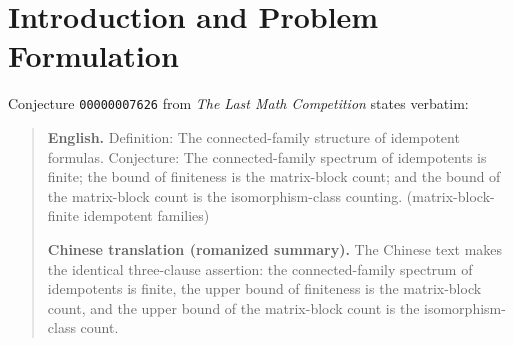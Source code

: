 \documentclass[11pt,a4paper]{article}
\theoremstyle{definition}
\newcommand{\Z}{\mathbb{Z}}
\newcommand{\N}{\mathbb{N}}
\newcommand{\Cl}{\mathrm{Cl}}
\newcommand{\Prim}{\mathrm{Prim}}
\begin{document}
\begin{abstract}
\begin{enumerate}
    $c_{\mathrm{alg}}(A)\le b(A)$, with strict failure $b(A)>c_{\mathrm{alg}}(A)=1$ whenever
    isomorphic blocks repeat (e.g.\ $\Cl_{1,0}(K)\cong K\oplus K$ gives $|\pi_0(E)|=4>b=2>c_{\mathrm{alg}}=1$,
    and $\Cl_{2,1}(K)\cong M_2(K)\oplus M_2(K)$ gives $|\pi_0(E^\circ)|=7>b=2>c_{\mathrm{alg}}=1$).
    Under module-isomorphism readings ($c_{\mathrm{simp}}=b$ or $c_{\mathrm{proj}}=\prod(n_i+1)$),
    the chained conjecture still fails at Clause~II.
  \item \textbf{Conceptual origin and primitive salvage:} Restricting to \emph{primitive}
    idempotents $\Prim(E(A))$ yields $|\pi_0(\Prim(E(A)))|=b(A)=c_{\mathrm{simp}}(A)$,
    identifying the conflation of primitive idempotents with general idempotents as the root
    source of the conjecture. Without finite-dimensionality, even Clause~I fails on $\Z^\N$.
\end{enumerate}
All core algebraic theorems, counterexamples, non-vacuity bijections, and nilpotent lifting
identities are machine-checked from first principles in Core Lean~4.19.0 with zero external
dependencies and zero \texttt{sorry} axioms.
\end{abstract}

\section{Introduction and Problem Formulation}

Conjecture \texttt{00000007626} from \emph{The Last Math Competition} states verbatim:

\begin{quote}
\textbf{English.} Definition: The connected-family structure of idempotent formulas.
Conjecture: The connected-family spectrum of idempotents is finite; the bound of finiteness
is the matrix-block count; and the bound of the matrix-block count is the isomorphism-class
counting. (matrix-block-finite idempotent families)

\smallskip
\textbf{Chinese translation (romanized summary).} The Chinese text makes the identical
three-clause assertion: the connected-family spectrum of idempotents is finite, the upper
bound of finiteness is the matrix-block count, and the upper bound of the matrix-block count
is the isomorphism-class count.
\end{quote}
\end{document}
